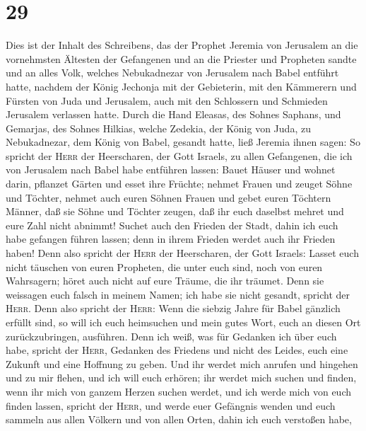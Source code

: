 \hypertarget{section-28}{%
\section{29}\label{section-28}}

 Dies ist der Inhalt des Schreibens, das der Prophet
Jeremia von Jerusalem an die vornehmsten Ältesten der Gefangenen und an
die Priester und Propheten sandte und an alles Volk, welches
Nebukadnezar von Jerusalem nach Babel entführt hatte, 
nachdem der König Jechonja mit der Gebieterin, mit den Kämmerern und
Fürsten von Juda und Jerusalem, auch mit den Schlossern und Schmieden
Jerusalem verlassen hatte.  Durch die Hand Eleasas, des
Sohnes Saphans, und Gemarjas, des Sohnes Hilkias, welche Zedekia, der
König von Juda, zu Nebukadnezar, dem König von Babel, gesandt hatte,
ließ Jeremia ihnen sagen:  So spricht der \textsc{Herr}
der Heerscharen, der Gott Israels, zu allen Gefangenen, die ich von
Jerusalem nach Babel habe entführen lassen:  Bauet Häuser
und wohnet darin, pflanzet Gärten und esset ihre Früchte; 
nehmet Frauen und zeuget Söhne und Töchter, nehmet auch euren Söhnen
Frauen und gebet euren Töchtern Männer, daß sie Söhne und Töchter
zeugen, daß ihr euch daselbst mehret und eure Zahl nicht abnimmt!
 Suchet auch den Frieden der Stadt, dahin ich euch habe
gefangen führen lassen; denn in ihrem Frieden werdet auch ihr Frieden
haben!  Denn also spricht der \textsc{Herr} der
Heerscharen, der Gott Israels: Lasset euch nicht täuschen von euren
Propheten, die unter euch sind, noch von euren Wahrsagern; höret auch
nicht auf eure Träume, die ihr träumet.  Denn sie
weissagen euch falsch in meinem Namen; ich habe sie nicht gesandt,
spricht der \textsc{Herr}.  Denn also spricht der
\textsc{Herr}: Wenn die siebzig Jahre für Babel gänzlich erfüllt sind,
so will ich euch heimsuchen und mein gutes Wort, euch an diesen Ort
zurückzubringen, ausführen.  Denn ich weiß, was für
Gedanken ich über euch habe, spricht der \textsc{Herr}, Gedanken des
Friedens und nicht des Leides, euch eine Zukunft und eine Hoffnung zu
geben.  Und ihr werdet mich anrufen und hingehen und zu
mir flehen, und ich will euch erhören;  ihr werdet mich
suchen und finden, wenn ihr mich von ganzem Herzen suchen werdet,
 und ich werde mich von euch finden lassen, spricht der
\textsc{Herr}, und werde euer Gefängnis wenden und euch sammeln aus
allen Völkern und von allen Orten, dahin ich euch verstoßen habe,
